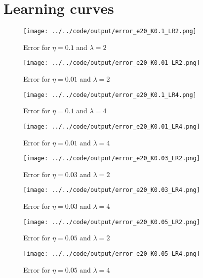 \documentclass[twoside, a4paper, fleqn, reqno]{article}
\begin{document}
\section{Learning curves}

\begin{figure}[H]
	\centering
	\texttt{[image: ../../code/output/error\_e20\_K0.1\_LR2.png]}
	\caption{Error for $\eta = 0.1$ and $\lambda = 2$}
	\label{fig:error_e20_K0.1_LR2}
\end{figure}

\begin{figure}[H]
	\centering
	\texttt{[image: ../../code/output/error\_e20\_K0.01\_LR2.png]}
	\caption{Error for $\eta = 0.01$ and $\lambda = 2$}
	\label{fig:error_e20_K0.01_LR2}
\end{figure}

\begin{figure}[H]
	\centering
	\texttt{[image: ../../code/output/error\_e20\_K0.1\_LR4.png]}
	\caption{Error for $\eta = 0.1$ and $\lambda = 4$}
	\label{fig:error_e20_K0.1_LR4}
\end{figure}

\begin{figure}[H]
	\centering
	\texttt{[image: ../../code/output/error\_e20\_K0.01\_LR4.png]}
	\caption{Error for $\eta = 0.01$ and $\lambda = 4$}
	\label{fig:error_e20_K0.01_LR4}
\end{figure}

\begin{figure}[H]
	\centering
	\texttt{[image: ../../code/output/error\_e20\_K0.03\_LR2.png]}
	\caption{Error for $\eta = 0.03$ and $\lambda = 2$}
	\label{fig:error_e20_K0.03_LR2}
\end{figure}

\begin{figure}[H]
	\centering
	\texttt{[image: ../../code/output/error\_e20\_K0.03\_LR4.png]}
	\caption{Error for $\eta = 0.03$ and $\lambda = 4$}
	\label{fig:error_e20_K0.03_LR4}
\end{figure}

\begin{figure}[H]
	\centering
	\texttt{[image: ../../code/output/error\_e20\_K0.05\_LR2.png]}
	\caption{Error for $\eta = 0.05$ and $\lambda = 2$}
	\label{fig:error_e20_K0.05_LR2}
\end{figure}

\begin{figure}[H]
	\centering
	\texttt{[image: ../../code/output/error\_e20\_K0.05\_LR4.png]}
	\caption{Error for $\eta = 0.05$ and $\lambda = 4$}
	\label{fig:error_e20_K0.05_LR4}
\end{figure}
\end{document}
